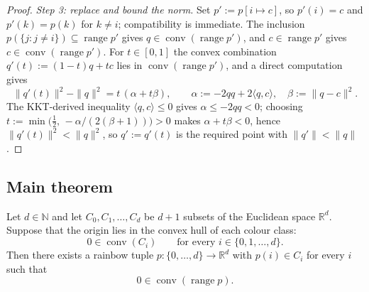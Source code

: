 \begin{proof}
\smallskip
\emph{Step 3: replace and bound the norm.} Set
\(p' := p[i \mapsto c]\), so \(p'(i) = c\) and
\(p'(k) = p(k)\) for \(k \neq i\); compatibility is immediate. The
inclusion
\(p(\{j : j \neq i\}) \subseteq \operatorname{range} p'\) gives
\(q \in \operatorname{conv}(\operatorname{range} p')\), and
\(c \in \operatorname{range} p'\) gives
\(c \in \operatorname{conv}(\operatorname{range} p')\). For
\(t \in [0,1]\) the convex combination
\(q'(t) := (1 - t) q + t c\) lies in
\(\operatorname{conv}(\operatorname{range} p')\), and a direct
computation gives
\[
  \|q'(t)\|^{2} - \|q\|^{2} = t \, (\alpha + t \beta), \qquad
  \alpha := -2 q q + 2 \langle q, c \rangle, \quad
  \beta := \|q - c\|^{2}.
\]
The KKT-derived inequality \(\langle q, c \rangle \le 0\) gives
\(\alpha \le -2 q q < 0\); choosing
\(t := \min\bigl(\tfrac{1}{2},\, -\alpha / (2(\beta + 1))\bigr) > 0\)
makes \(\alpha + t \beta < 0\), hence
\(\|q'(t)\|^{2} < \|q\|^{2}\), so \(q' := q'(t)\) is the required
point with \(\|q'\| < \|q\|\).
\end{proof}

\subsection*{Main theorem}

\begin{theorem}
\label{thm:colorful_caratheodory}
\leanok
Let \(d \in \mathbb{N}\) and let \(C_0, C_1, \dots, C_d\) be \(d+1\)
subsets of the Euclidean space \(\mathbb{R}^d\). Suppose that the
origin lies in the convex hull of each colour class:
\[
0 \in \operatorname{conv}(C_i) \qquad \text{for every } i \in \{0, 1, \dots, d\}.
\]
Then there exists a rainbow tuple
\(p : \{0,\dots,d\} \to \mathbb{R}^d\) with \(p(i) \in C_i\) for every
\(i\) such that
\[
0 \in \operatorname{conv}(\operatorname{range} p).
\]
\end{theorem}

